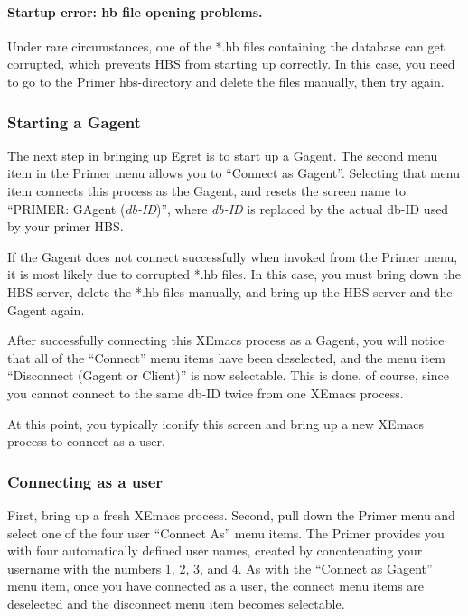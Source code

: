 \paragraph{Startup error: hb file opening problems.}  Under rare
circumstances, one of the *.hb files containing the database can get
corrupted, which prevents HBS from starting up correctly. In this case, you
need to go to the Primer hbs-directory and delete the files manually, 
then try again. 



\subsubsection{Starting a Gagent}

The next step in bringing up Egret is to start up a Gagent.  The second
menu item in the Primer menu allows you to ``Connect as Gagent''.
Selecting that menu item connects this process as the Gagent, and resets
the screen name to ``PRIMER: GAgent ({\em db-ID})'', where {\em db-ID} is
replaced by the actual db-ID used by your primer HBS.

If the Gagent does not connect successfully when invoked from the Primer
menu, it is most likely due to corrupted *.hb files.  In this case, you
must bring down the HBS server, delete the *.hb files manually, and bring
up the HBS server and the Gagent again. 

After successfully connecting this XEmacs process as a Gagent, you will 
notice that all of the ``Connect'' menu items have been deselected, and 
the menu item ``Disconnect (Gagent or Client)'' is now selectable.  This
is done, of course, since you cannot connect to the same db-ID twice from 
one XEmacs process.  

At this point, you typically iconify this screen and bring up a new 
XEmacs process to connect as a user. 

\subsubsection{Connecting as a user}

First, bring up a fresh XEmacs process. Second, pull down the Primer menu
and select one of the four user ``Connect As'' menu items.  The Primer
provides you with four automatically defined user names, created by
concatenating your username with the numbers 1, 2, 3, and 4. As with the ``Connect
as Gagent'' menu item, once you have connected as a user, the connect menu
items are deselected and the disconnect menu item becomes selectable.

